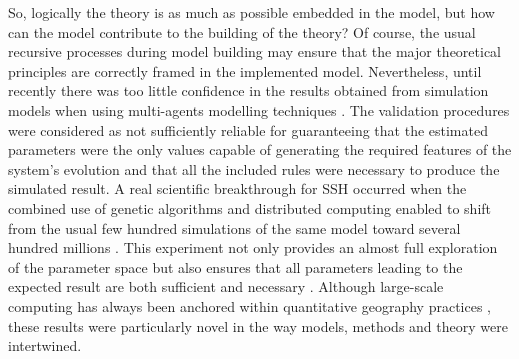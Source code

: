 \documentclass[10pt,letterpaper]{article}
\begin{document}
So, logically the theory is as much as possible embedded in the model, but how can the model contribute to the building of the theory? Of course, the usual recursive processes during model building may ensure that the major theoretical principles are correctly framed in the implemented model. Nevertheless, until recently there was too little confidence in the results obtained from simulation models when using multi-agents modelling techniques \citep{rey2015plateforme}. The validation procedures were considered as not sufficiently reliable for guaranteeing that the estimated parameters were the only values capable of generating the required features of the system’s evolution and that all the included rules were necessary to produce the simulated result. A real scientific breakthrough for SSH occurred when the combined use of genetic algorithms and distributed computing enabled to shift from the usual few hundred simulations of the same model toward several hundred millions \citep{schmitt2015half}. This experiment not only provides an almost full exploration of the parameter space but also ensures that all parameters leading to the expected result are both sufficient and necessary \citep{reuillon2015new,raimbault2019methods}. Although large-scale computing has always been anchored within quantitative geography practices \citep{rey2019calcul}, these results were particularly novel in the way models, methods and theory were intertwined.
\end{document}

